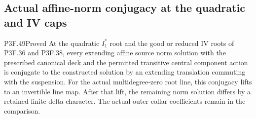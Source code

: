 \subsection{Actual affine-norm conjugacy at the quadratic and IV caps}

\begin{statement}{P3F.49}{Proved}
At the quadratic $I_1^*$ root and the good or reduced IV roots of
P3F.36 and P3F.38, every extending affine source norm solution
with the prescribed canonical deck and the permitted transitive
central component action is conjugate to the constructed solution
by an extending translation commuting with the suspension.
For the actual multidegree-zero root line, this conjugacy lifts
to an invertible line map. After that lift, the remaining norm
solution differs by a retained finite delta character.
The actual outer collar coefficients remain in the comparison.
\end{statement}
